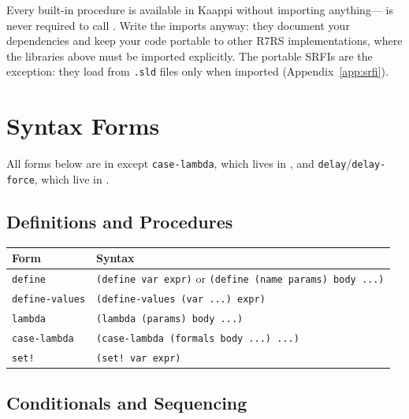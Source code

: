 \begin{note}
Every built-in procedure is available in Kaappi without importing anything--- is never required to call . Write the imports anyway: they document your dependencies and keep your code portable to other R7RS implementations, where the libraries above must be imported explicitly. The \srfiportable{} portable SRFIs are the exception: they load from \texttt{.sld} files only when imported (Appendix~\ref{app:srfi}).
\end{note}

\section{Syntax Forms}

All forms below are in  except \texttt{case-lambda}, which lives in , and \texttt{delay}/\texttt{delay-force}, which live in .

\subsection*{Definitions and Procedures}

\begin{center}
\small
\begin{tabularx}{\textwidth}{@{}lY@{}}
\textbf{Form} & \textbf{Syntax} \\
\hline
\texttt{define} & \texttt{(define var expr)} or \texttt{(define (name params) body ...)} \\
\texttt{define-values} & \texttt{(define-values (var ...) expr)} \\
\texttt{lambda} & \texttt{(lambda (params) body ...)} \\
\texttt{case-lambda} & \texttt{(case-lambda (formals body ...) ...)} \\
\texttt{set!} & \texttt{(set! var expr)} \\
\end{tabularx}
\end{center}

\subsection*{Conditionals and Sequencing}

